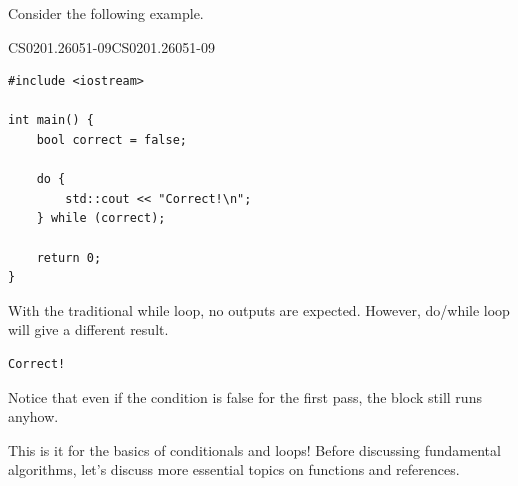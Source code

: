 \documentclass[../../main.tex]{subfiles}
\begin{document}
Consider the following example.

\begin{cppbox}{CS0201.26051-09}{CS0201.26051-09}
\begin{lstlisting}[style=cppstyle]
#include <iostream>

int main() {
    bool correct = false;

    do {
        std::cout << "Correct!\n";
    } while (correct);

    return 0;
}
\end{lstlisting}
\end{cppbox}

With the traditional while loop, no outputs are expected. However,
do/while loop will give a different result.

\begin{outputbox}
\begin{lstlisting}[style=basic]
Correct!
\end{lstlisting}
\end{outputbox}

Notice that even if the condition is false for the first pass,
the block still runs anyhow.

This is it for the basics of conditionals and loops! Before discussing
fundamental algorithms, let's discuss more essential topics on
functions and references.
\end{document}
